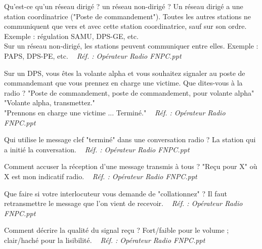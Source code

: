 \documentclass[grid,avery5371,landscape]{flashcards}
\makeatletter
\newcounter{nocarte}
\newcommand{\categ}[1]{%
  \def\@categ{#1}%
  \setcounter{nocarte}{0}%
}
\newcommand{\source}[1]{%
  \medskip
  \itshape%
   ~ \hfill Réf. : #1}
\makeatother
\begin{document}
\color[HTML]{01DFA5}
\categ{TECH}
\begin{flashcard}[radio]{
 Qu'est-ce qu'un réseau dirigé ? un réseau non-dirigé ?   }
  Un réseau dirigé a une station coordinatrice ("Poste de commandement"). Toutes les autres stations ne communiquent que vers et avec cette station coordinatrice, sauf sur son ordre. Exemple : régulation SAMU, DPS-GE, etc. \\
Sur un réseau non-dirigé, les stations peuvent communiquer entre elles. Exemple : PAPS, DPS-PE, etc.
  \source{Opérateur Radio FNPC.ppt}
\end{flashcard}


\color[HTML]{01DFA5}
\categ{TECH}
\begin{flashcard}[radio]{
 Sur un DPS, vous êtes la volante alpha et vous souhaitez signaler au poste de commandemant que vous prennez en charge une victime. Que dites-vous à la radio ?   }
  "Poste de commandement, poste de commandement, pour volante alpha" \\
"Volante alpha, transmettez." \\
"Prennons en charge une victime ... Terminé."
  \source{Opérateur Radio FNPC.ppt}
\end{flashcard}


\color[HTML]{01DFA5}
\categ{TECH}
\begin{flashcard}[radio]{
 Qui utilise le message clef "terminé" dans une conversation radio ?   }
  La station qui a initié la conversation.
  \source{Opérateur Radio FNPC.ppt}
\end{flashcard}


\color[HTML]{01DFA5}
\categ{TECH}
\begin{flashcard}[radio]{
 Comment accuser la réception d'une message transmis à tous ?   }
  "Reçu pour X" où X est mon indicatif radio.
  \source{Opérateur Radio FNPC.ppt}
\end{flashcard}


\color[HTML]{01DFA5}
\categ{TECH}
\begin{flashcard}[radio]{
 Que faire si votre interlocuteur vous demande de "collationnez" ?   }
  Il faut retransmettre le message que l'on vient de recevoir.
  \source{Opérateur Radio FNPC.ppt}
\end{flashcard}


\color[HTML]{01DFA5}
\categ{TECH}
\begin{flashcard}[radio]{
 Comment décrire la qualité du signal reçu ?   }
  Fort/faible pour le volume ; clair/haché pour la lisibilité.
  \source{Opérateur Radio FNPC.ppt}
\end{flashcard}
\end{document}
